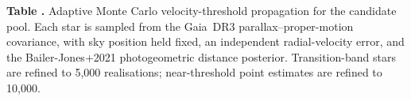 \begin{center}
\label{tab:mc}
\begin{minipage}{\columnwidth}
\small\textbf{Table \thetable.} Adaptive Monte Carlo velocity-threshold
propagation for the candidate pool. Each star is sampled from the
Gaia~DR3 parallax--proper-motion covariance, with sky position held fixed,
an independent radial-velocity error, and the Bailer-Jones+2021
photogeometric distance posterior. Transition-band stars are refined to
5{,}000 realisations; near-threshold point estimates are refined to
10{,}000.
\end{minipage}
\vspace{0.4ex}

\scriptsize
\setlength{\tabcolsep}{4pt}
\end{center}

